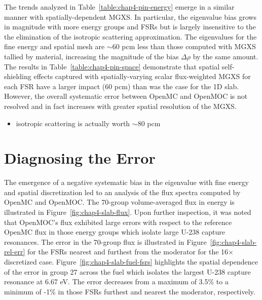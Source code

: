 The trends analyzed in Table~\ref{table:chap4-pin-energy} emerge in a similar manner with spatially-dependent \ac{MGXS}. In particular, the eigenvalue bias grows in magnitude with more energy groups and \ac{FSR}s but is largely insensitive to the the elimination of the isotropic scattering approximation. The eigenvalues for the fine energy and spatial mesh are $\sim$60 pcm less than those computed with \ac{MGXS} tallied by material, increasing the magnitude of the bias $\Delta\rho$ by the same amount. The results in Table~\ref{table:chap4-pin-space} demonstrate that spatial self-shielding effects captured with spatially-varying scalar flux-weighted \ac{MGXS} for each \ac{FSR} have a larger impact (60 pcm) than was the case for the 1D slab. However, the overall systematic error between OpenMC and OpenMOC is not resolved and in fact increases with greater spatial resolution of the \ac{MGXS}.

\begin{itemize}[noitemsep]
\item isotropic scattering is actually worth $\sim$80 pcm
\end{itemize}





\section{Diagnosing the Error}
\label{sec:chap4-diagnosis}

The emergence of a negative systematic bias in the eigenvalue with fine energy and spatial discretization led to an analysis of the flux spectra computed by OpenMC and OpenMOC. The 70-group volume-averaged flux in energy is illustrated in Figure~\ref{fig:chap4-slab-flux}. Upon further inspection, it was noted that OpenMOC's flux exhibited large errors with respect to the reference OpenMC flux in those energy groups which isolate large U-238 capture resonances. The error in the 70-group flux is illustrated in Figure~\ref{fig:chap4-slab-rel-err} for the \ac{FSR}s nearest and furthest from the moderator for the 16$\times$ discretized case. Figure~\ref{fig:chap4-slab-fuel-fsrs} highlights the spatial dependence of the error in group 27 across the fuel which isolates the largest U-238 capture resonance at 6.67 eV. The error decreases from a maximum of 3.5\% to a minimum of -1\% in those \ac{FSR}s furthest and nearest the moderator, respectively.

